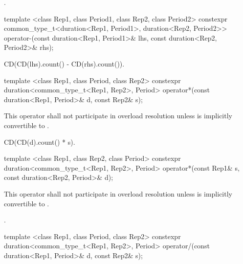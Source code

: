\begin{itemdescr}
\pnum
\returns {}.
\end{itemdescr}

%
\begin{itemdecl}
template <class Rep1, class Period1, class Rep2, class Period2>
  constexpr common_type_t<duration<Rep1, Period1>, duration<Rep2, Period2>>
  operator-(const duration<Rep1, Period1>& lhs, const duration<Rep2, Period2>& rhs);
\end{itemdecl}

\begin{itemdescr}
\pnum
\returns CD(CD(lhs).count() - CD(rhs).count()).
\end{itemdescr}

%
%
\begin{itemdecl}
template <class Rep1, class Period, class Rep2>
  constexpr duration<common_type_t<Rep1, Rep2>, Period>
  operator*(const duration<Rep1, Period>& d, const Rep2& s);
\end{itemdecl}

\begin{itemdescr}
\pnum
\remarks This operator shall not participate in overload
resolution unless  is implicitly convertible to .

\pnum
\returns CD(CD(d).count() * s).
\end{itemdescr}

%
%
\begin{itemdecl}
template <class Rep1, class Rep2, class Period>
  constexpr duration<common_type_t<Rep1, Rep2>, Period>
  operator*(const Rep1& s, const duration<Rep2, Period>& d);
\end{itemdecl}

\begin{itemdescr}
\pnum
\remarks This operator shall not participate in overload
resolution unless  is implicitly convertible to .

\pnum
\returns {}.
\end{itemdescr}

%
%
\begin{itemdecl}
template <class Rep1, class Period, class Rep2>
  constexpr duration<common_type_t<Rep1, Rep2>, Period>
  operator/(const duration<Rep1, Period>& d, const Rep2& s);
\end{itemdecl}

